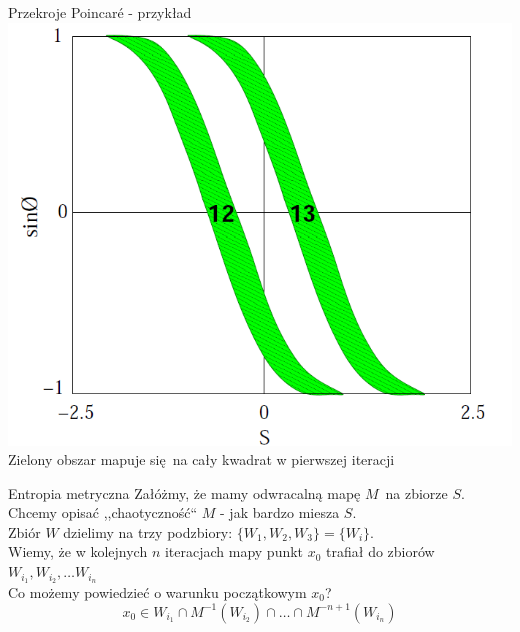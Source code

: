 \documentclass{beamer}
\begin{document}
\begin{frame}{Przekroje Poincaré - przykład}
\centering
\includegraphics[height=0.7\textheight]{poincare_section}\\
Zielony obszar mapuje się na cały kwadrat w pierwszej iteracji
\end{frame}

\begin{frame}{Entropia metryczna} \pause
	Załóżmy, że mamy odwracalną mapę $M$ na zbiorze $S$.\pause \\
	Chcemy opisać ,,chaotyczność`` $M$ - jak bardzo miesza $S$.\\ \pause
	Zbiór $W$ dzielimy na trzy podzbiory: $\{W_1, W_2, W_3\} = \{W_i\}$.\\\pause
	Wiemy, że w kolejnych $n$ iteracjach mapy punkt $x_0$ trafiał do zbiorów
  $W_{i_1}, W_{i_2}, \dots W_{i_n}$\pause\\
	Co możemy powiedzieć o warunku początkowym $x_0$?\pause
	\begin{equation*}
		x_0 \in W_{i_1} \cap M^{-1}(W_{i_2}) \cap \dots \cap M^{-n+1}(W_{i_n})
	\end{equation*}
\end{frame}
\end{document}
